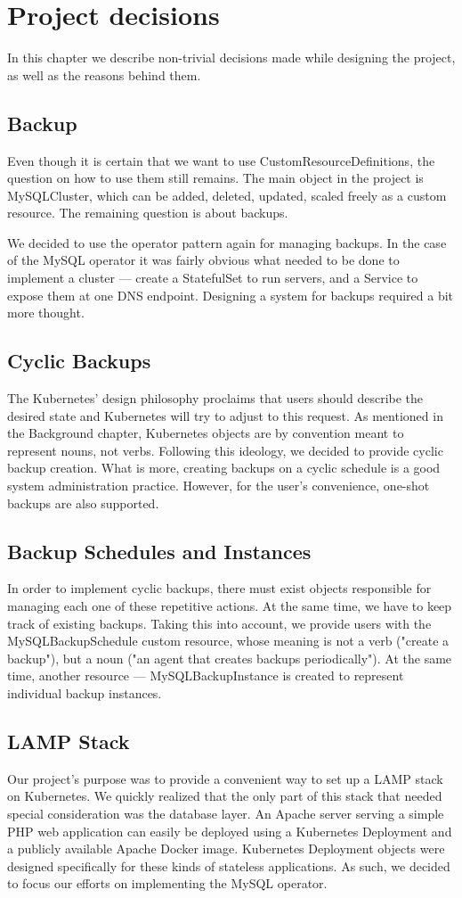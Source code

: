 \chapter{Project decisions}
In this chapter we describe non-trivial decisions made while designing the project, as well as the
reasons behind them.

\section{Backup}
Even though it is certain that we want to use CustomResourceDefinitions, the question on how to
use them still remains. The main object in the project is MySQLCluster, which can be added,
deleted, updated, scaled freely as a custom resource. The remaining question is about backups.

We decided to use the operator pattern again for managing backups. In the case of the MySQL
operator it was fairly obvious what needed to be done to implement a cluster --- create a
StatefulSet to run servers, and a Service to expose them at one DNS endpoint. Designing a system
for backups required a bit more thought.

\section{Cyclic Backups}
The Kubernetes' design philosophy proclaims that users should describe the desired state and
Kubernetes will try to adjust to this request. As mentioned in the Background chapter, Kubernetes
objects are by convention meant to represent nouns, not verbs. Following this ideology, we
decided to provide cyclic backup creation. What is more, creating backups on a cyclic schedule
is a good system administration practice. However, for the user's convenience, one-shot backups are
also supported.

\section{Backup Schedules and Instances}
In order to implement cyclic backups, there must exist objects responsible for managing each one of
these repetitive actions. At the same time, we have to keep track of existing backups. Taking this
into account, we provide users with the MySQLBackupSchedule custom resource, whose meaning is not a
verb ("create a backup"), but a noun ("an agent that creates backups periodically"). At the same
time, another resource --- MySQLBackupInstance is created to represent individual backup instances.

\section{LAMP Stack}
Our project's purpose was to provide a convenient way to set up a LAMP
stack on Kubernetes. We quickly realized that the only part of this stack that needed special
consideration was the database layer. An Apache server serving a simple PHP web application can
easily be deployed using a Kubernetes Deployment and a publicly available Apache Docker image.
Kubernetes Deployment objects were designed specifically for these kinds of stateless applications.
As such, we decided to focus our efforts on implementing the MySQL operator.
